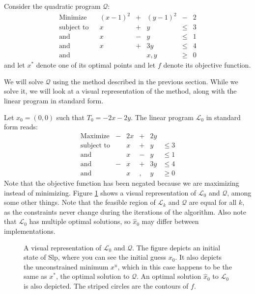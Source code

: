 Consider the quadratic program $\mathcal{Q}$:
\[
\begin{array}{lcrcrcr}
\textrm{Minimize}           & &   (x-1)^2 &+&   (y-1)^2 & - &  2 \\
\textrm{subject to}         & &         x &+&         y &\leq& 3 \\
\textrm{and}                & &         x &-&         y &\leq& 1 \\
\textrm{and}                & &         x &+&       3 y &\leq& 4 \\
\textrm{and}                & &           & &       x,y &\geq& 0
\end{array}
\]
and let $x^*$ denote one of its optimal points and let $f$ denote its objective
function.

We will solve $\mathcal{Q}$ using the method described in the previous
section. While we solve it, we will look at a visual representation of the
method, along with the linear program in standard form.

Let $x_0 = (0,0)$ such that $T_0 = -2x - 2y$. The linear program
$\mathcal{L}_0$ in standard form reads:
\[
\begin{array}{lcrcrl}
    \textrm{Maximize}   &-& 2 x &+& 2 y \\
    \textrm{subject to} & &   x &+&   y & \leq 3 \\
    \textrm{and}        & &   x &-&   y & \leq 1 \\
    \textrm{and}        &-&   x &+& 3 y & \leq 4 \\
    \textrm{and}        & &   x &,&   y & \geq 0
\end{array}
\]
Note that the objective function has been negated because we are maximizing
instead of minimizing.
Figure \ref{fig:lp1} shows a visual representation of $\mathcal{L}_0$ and
$\mathcal{Q}$, among some other things.
Note that the feasible region of $\mathcal{L}_k$ and
$\mathcal{Q}$ are equal for all $k$, as the constraints never change during the
iterations of the algorithm. Also note that $\mathcal{L}_0$ has multiple
optimal solutions, so $\hat{x}_0$ may differ between implementations.

\begin{figure}[ht!]
    \centering
    
    \caption{A visual representation of $\mathcal{L}_0$ and $\mathcal{Q}$.
             The figure depicts an initial state
             of Slp, where you can see the initial guess $x_0$. It also
             depicts the unconstrained minimum $x^u$, which in this case
             happens to be the same as $x^*$, the optimal solution to
             $\mathcal{Q}$. An optimal solution $\hat{x}_0$ to $\mathcal{L}_0$
             is also depicted. The striped circles are the contours of $f$.}
    \label{fig:lp1}
\end{figure}


